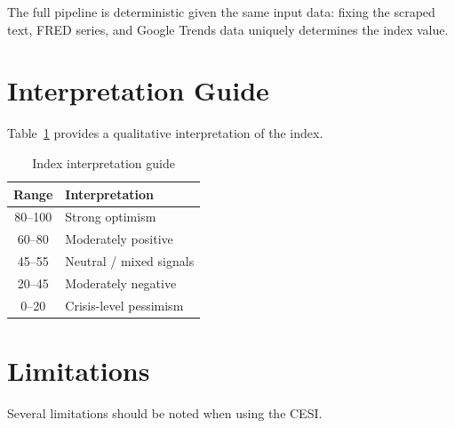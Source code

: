 \documentclass[11pt]{article}
\begin{document}
The full pipeline is deterministic given the same input data: fixing
the scraped text, FRED series, and Google Trends data uniquely
determines the index value.

\section{Interpretation Guide}\label{sec:interp}

Table~\ref{tab:interp} provides a qualitative interpretation of the
index.

\begin{table}[H]
\centering
\caption{Index interpretation guide}
\label{tab:interp}
\begin{tabular}{@{}cl@{}}
\toprule
Range & Interpretation \\
\midrule
80--100 & Strong optimism \\
60--80  & Moderately positive \\
45--55  & Neutral / mixed signals \\
20--45  & Moderately negative \\
0--20   & Crisis-level pessimism \\
\bottomrule
\end{tabular}
\end{table}

\section{Limitations}\label{sec:limitations}

Several limitations should be noted when using the CESI.
\end{document}
